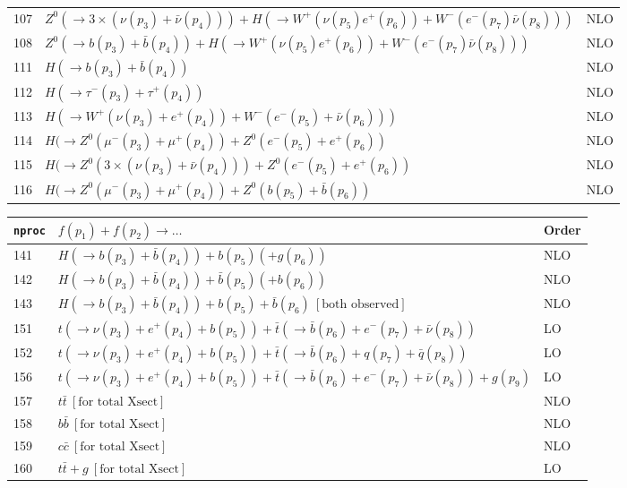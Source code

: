 \documentclass[12pt]{article}
\begin{document}
\begin{itemize}
\begin{table}
\begin{center}
\begin{tabular}{|l|l|l|}
107& $ Z^0(\to 3\times(\nu(p_3)+\bar{\nu}(p_4))) + H(\to W^+(\nu(p_5) e^+(p_6)) + W^-(e^-(p_7) \bar{\nu}(p_8))) $ & NLO \\
108& $ Z^0(\to b(p_3)+\bar{b}(p_4)) + H(\to W^+(\nu(p_5) e^+(p_6)) + W^-(e^-(p_7) \bar{\nu}(p_8))) $ & NLO \\     
\hline 
111& $ H(\to b(p_3)+\bar{b}(p_4)) $ & NLO \\
112& $ H(\to \tau^-(p_3)+\tau^+(p_4)) $ & NLO \\
113& $ H(\to  W^+(\nu(p_3)+e^+(p_4)) + W^-(e^-(p_5)+\bar{\nu}(p_6))) $ & NLO \\
114& $ H(\to Z^0(\mu^-(p_3)+\mu^+(p_4)) + Z^0(e^-(p_5)+e^+(p_6)) $ & NLO \\
115& $ H(\to Z^0(3\times(\nu(p_3)+\bar{\nu}(p_4)))+ Z^0(e^-(p_5)+e^+(p_6)) $ & NLO \\
116& $ H(\to Z^0(\mu^-(p_3)+\mu^+(p_4)) + Z^0(b(p_5)+\bar{b}(p_6)) $ & NLO \\
\hline 
\end{tabular}
\end{center}
\end{table}
\begin{table}
\begin{center}
\hspace*{-1.5cm}
\begin{tabular}{|l|l|l|}
\hline
{\tt nproc} & $ f(p_1)+f(p_2) \to \ldots $& Order \\ 
\hline
141& $ H(\to b(p_3)+\bar{b}(p_4)) + b(p_5) (+g(p_6)) $ & NLO \\
142& $ H(\to b(p_3)+\bar{b}(p_4)) + \bar{b}(p_5) (+b(p_6)) $ & NLO \\
143& $ H(\to b(p_3)+\bar{b}(p_4)) + b(p_5) + \bar{b}(p_6) ~[ \mbox{both observed} ] $ & NLO \\
\hline 
151& $ t(\to \nu(p_3)+e^+(p_4)+b(p_5))+\bar{t}(\to \bar{b}(p_6)+e^-(p_7)+\bar{\nu}(p_8)) $ & LO \\
152& $ t(\to \nu(p_3)+e^+(p_4)+b(p_5))+\bar{t}(\to \bar{b}(p_6)+q(p_7)+\bar{q}(p_8)) $ & LO \\
\hline 
156& $t(\to \nu(p_3)+e^+(p_4)+b(p_5))+\bar{t}(\to \bar{b}(p_6) +e^-(p_7)+\bar{\nu}(p_8))+g(p_9) $ & LO \\
\hline 
157& $ t \bar{t} ~[ \mbox{for total Xsect} ] $ & NLO \\
158& $ b \bar{b} ~[ \mbox{for total Xsect} ] $ & NLO \\
159& $ c \bar{c} ~[ \mbox{for total Xsect} ] $ & NLO \\
160& $ t \bar{t} + g ~[ \mbox{for total Xsect} ] $ & LO \\

\end{tabular}
\end{center}
\end{table}
\end{itemize}
\end{document}
